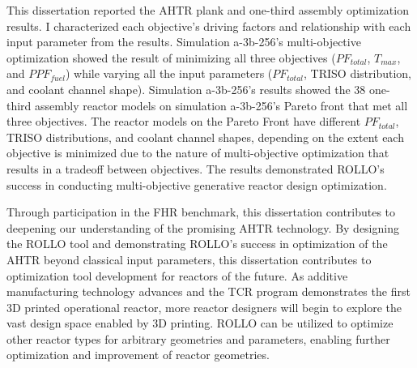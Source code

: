 This dissertation reported the \gls{AHTR} plank and one-third assembly optimization 
results. 
I characterized each objective's driving factors and relationship with each input 
parameter from the results. 
Simulation a-3b-256's multi-objective optimization showed the result of minimizing all 
three objectives ($PF_{total}$, $T_{max}$, and $PPF_{fuel}$) while varying 
all the input parameters ($PF_{total}$, TRISO distribution, and coolant channel shape).
Simulation a-3b-256's results showed the 38 one-third assembly reactor models on 
simulation a-3b-256's Pareto front that met all three objectives. 
The reactor models on the Pareto Front have different $PF_{total}$, TRISO distributions, 
and coolant channel shapes, depending on the extent each objective is minimized due 
to the nature of multi-objective optimization that results in a tradeoff between 
objectives. 
The results demonstrated \gls{ROLLO}'s success in conducting multi-objective generative 
reactor design optimization. 

Through participation in the \gls{FHR} benchmark, this dissertation contributes to 
deepening our understanding of the promising \gls{AHTR} technology. 
By designing the \gls{ROLLO} tool and demonstrating \gls{ROLLO}'s success in 
optimization of the \gls{AHTR} beyond classical input parameters, this dissertation 
contributes to optimization tool development for reactors of the future. 
As additive manufacturing technology advances and the \gls{TCR} program 
demonstrates the first 3D printed operational reactor, more reactor designers 
will begin to explore the vast design space enabled by 3D printing. 
\gls{ROLLO} can be utilized to optimize other reactor types for arbitrary
geometries and parameters, enabling further optimization and improvement of reactor 
geometries.